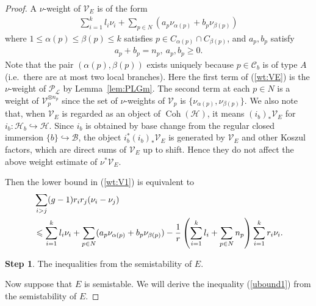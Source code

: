\documentclass[11pt,oneside,a4paper,mathscr]{amsart}
\theoremstyle{definition}
\newtheorem{step}{Step}
\renewcommand{\leq}{\leqslant}
\renewcommand{\geq}{\geqslant}
\newcommand{\cH}{\mathcal{H}}
\newcommand{\cB}{\mathcal{B}}
\newcommand{\cC}{\mathcal{C}}
\newcommand{\Coh}{\operatorname{Coh}}
\begin{document}
\begin{proof}
A $\nu$-weight of $\mathcal{V}_E$ is of the form 
\begin{align}\label{wt:VE}
    \sum_{i=1}^k l_i \nu_i+\sum_{p\in N}(a_p\nu_{\alpha(p)}+b_p\nu_{\beta(p)})
\end{align}
where $1\leq \alpha(p) \leq \beta(p) \leq k$ satisfies $p \in C_{\alpha(p)}\cap C_{\beta(p)}$, 
and $a_p, b_p$ satisfy 
\begin{align*}
    a_p+b_p=n_p, \ a_p, b_p \geq 0.
\end{align*}
Note that the pair $(\alpha(p), \beta(p))$ exists uniquely because $p\in \cC_b$ is of type $A$ (i.e.\ there are at most two local branches). Here the first term of (\ref{wt:VE}) is the $\nu$-weight of $\mathcal{P}_{\mathcal{L}}$ by Lemma~\ref{lem:PLGm}.
The second term at each $p\in N$ is a weight of $\mathcal{V}_p^{\otimes n_p}$ since the set of $\nu$-weights of $\mathcal{V}_p$ is $\{\nu_{\alpha(p)}, \nu_{\beta(p)}\}$. 
We also note that, when $\mathcal V_E$ is regarded as an object of $\Coh(\cH)$, it means 
$(i_b)_*\mathcal V_E$ for $i_b\colon \cH_b\hookrightarrow \cH$. Since $i_b$ is obtained by base change from the regular closed immersion 
$\{b\}\hookrightarrow \cB$, the object $i_b^* (i_b)_{*}\mathcal{V}_E$ is generated by $\mathcal{V}_E$ and other Koszul factors, which are direct sums of $\mathcal{V}_E$ up to shift. Hence they do not affect the above weight estimate of $\nu^* \mathcal{V}_E$.

Then the lower bound in (\ref{wt:V1}) is equivalent to 
\begin{align} \label{ubound1}
    &\sum_{i>j}(g-1)r_i r_j (\nu_i-\nu_j)  \\
  \notag &\leq \sum_{i=1}^k l_i \nu_i+\sum_{p\in N}(a_p\nu_{\alpha(p)}+b_p\nu_{\beta(p)})-\frac{1}{r}\left(\sum_{i=1}^k l_i+\sum_{p\in N}n_p  \right)
  \sum_{i=1}^k r_i \nu_i.
\end{align}
\begin{step}
    The inequalities from the semistability of $E$.
\end{step}
Now suppose that $E$ is semistable. We will derive the inequality (\ref{ubound1})
from the semistability of $E$. 


\end{proof}
\end{document}
